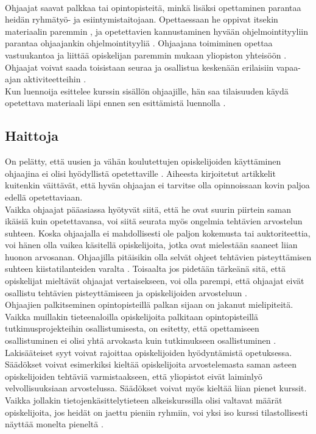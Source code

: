 \documentclass[finnish]{tktltiki2}
\theoremstyle{definition}
\theoremstyle{remark}
\begin{document}
\\
Ohjaajat saavat palkkaa tai opintopisteitä, minkä lisäksi opettaminen parantaa heidän ryhmätyö- ja esiintymistaitojaan. Opettaessaan he oppivat itsekin materiaalin paremmin \cite{Reges03}, ja opetettavien kannustaminen hyvään ohjelmointityyliin parantaa ohjaajankin ohjelmointityyliä \cite{Roberts95}. Ohjaajana toimiminen opettaa vastuukantoa ja liittää opiskelijan paremmin mukaan yliopiston yhteisöön \cite{Dickson11}. Ohjaajat voivat saada toisistaan seuraa ja osallistua keskenään erilaisiin vapaa-ajan aktiviteetteihin \cite{Roberts95}.
\\
Kun luennoija esittelee kurssin sisällön ohjaajille, hän saa tilaisuuden käydä opetettava materiaali läpi ennen sen esittämistä luennolla \cite{Kopp00}.


\subsection{Haittoja}
On pelätty, että uusien ja vähän koulutettujen opiskelijoiden käyttäminen ohjaajina ei olisi hyödyllistä opetettaville \cite{Harper02}. Aiheesta kirjoitetut artikkelit kuitenkin väittävät, että hyvän ohjaajan ei tarvitse olla opinnoissaan kovin paljoa edellä opetettaviaan.
\\
Vaikka ohjaajat pääasiassa hyötyvät siitä, että he ovat suurin piirtein saman ikäisiä kuin opetettavansa, voi siitä seurata myös ongelmia tehtävien arvostelun suhteen. Koska ohjaajalla ei mahdollisesti ole paljon kokemusta tai auktoriteettia, voi hänen olla vaikea käsitellä opiskelijoita, jotka ovat mielestään saaneet liian huonon arvosanan. Ohjaajilla pitäisikin olla selvät ohjeet tehtävien pisteyttämisen suhteen kiistatilanteiden varalta \cite{Roberts95}. Toisaalta jos pidetään tärkeänä sitä, että opiskelijat mieltävät ohjaajat vertaisekseen, voi olla parempi, että ohjaajat eivät osallistu tehtävien pisteyttämiseen ja opiskelijoiden arvosteluun \cite{Morgan02}.
\\
Ohjaajien palkitseminen opintopisteillä palkan sijaan on jakanut mielipiteitä. Vaikka muillakin tieteenaloilla opiskelijoita palkitaan opintopisteillä tutkimusprojekteihin osallistumisesta, on esitetty, että opettamiseen osallistuminen ei olisi yhtä arvokasta kuin tutkimukseen osallistuminen \cite{Reges88}.
\\
Lakisääteiset syyt voivat rajoittaa opiskelijoiden hyödyntämistä opetuksessa. Säädökset voivat esimerkiksi kieltää opiskelijoita arvostelemasta saman asteen opiskelijoiden tehtäviä varmistaakseen, että yliopistot eivät laiminlyö velvollisuuksiaan arvostelussa. Säädökset voivat myös kieltää liian pienet kurssit. Vaikka jollakin tietojenkäsittelytieteen alkeiskurssilla olisi valtavat määrät opiskelijoita, jos heidät on jaettu pieniin ryhmiin, voi yksi iso kurssi tilastollisesti näyttää monelta pieneltä \cite{Reges03}.
\end{document}
